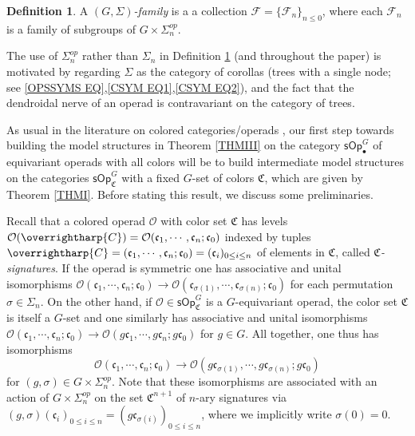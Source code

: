 \documentclass[a4paper,10pt
,draft
]{article}%
\numberwithin{equation}{section}
\numberwithin{figure}{section}
\theoremstyle{definition} %
\newtheorem{definition}[equation]{Definition}%
\newcommand{\vect}[1]{\text{\overrightharp{\ensuremath{#1}}}}
\renewcommand{\O}{\ensuremath{\mathcal O}}
\newcommand{\1}{\ensuremath{\mathbbm 1}}%
\begin{document}
\begin{definition}\label{FAM1ST DEF}
	A \emph{$(G,\Sigma)$-family} is a
	a collection
	$\mathcal{F} = \{\mathcal{F}_n\}_{n \leq 0}$,
	where each $\mathcal{F}_n$
	is a family of subgroups of $G \times \Sigma_n^{op}$.
\end{definition}

The use of $\Sigma_n^{op}$ rather than $\Sigma_n$
in Definition \ref{FAM1ST DEF} 
(and throughout the paper) 
is motivated by regarding $\Sigma$
as the category of corollas (trees with a single node; 
see \eqref{OPSSYMS EQ},\eqref{CSYM EQ1},\eqref{CSYM EQ2}),
and the fact that the dendroidal nerve \cite[\S 1]{MW07} of an operad is contravariant on the category of trees.


As usual in the literature on colored categories/operads
\cite{BM07,Rob11,CM13b,Cav},
our first step towards building the model structures 
in Theorem \ref{THMIII}
on the category
$\mathsf{sOp}^G_{\bullet}$
of equivariant operads with all colors 
will be to build intermediate model structures on the categories
$\mathsf{sOp}^G_{\mathfrak{C}}$
with a fixed $G$-set of colors $\mathfrak{C}$,
which are given by Theorem \ref{THMI}.
Before stating this result, we discuss some preliminaries.



Recall that a colored operad $\O$
with color set $\mathfrak{C}$ has levels 
$
\O(\vect{C})=
\O(\mathfrak{c}_1,\cdots,\mathfrak{c}_n;\mathfrak{c}_0)$
indexed by tuples
$\vect{C} = (\mathfrak{c}_1,\cdots,\mathfrak{c}_n;\mathfrak{c}_0) = (\mathfrak c_i)_{0 \leq i \leq n}$
of elements in $\mathfrak{C}$, called \emph{$\mathfrak{C}$-signatures}.
If the operad is symmetric one has associative and unital isomorphisms
$
\O(\mathfrak{c}_1,\cdots,\mathfrak{c}_n;\mathfrak{c}_0) \to 
\O(\mathfrak{c}_{\sigma(1)},\cdots,\mathfrak{c}_{\sigma(n)};\mathfrak{c}_0)
$
for each permutation $\sigma \in \Sigma_n$.
On the other hand, if 
$\O \in \mathsf{sOp}^G_{\mathfrak{C}}$
is a $G$-equivariant operad, 
the color set $\mathfrak{C}$ is itself a $G$-set
and one similarly has associative and unital isomorphisms
$
\O(\mathfrak{c}_1,\cdots,\mathfrak{c}_n;\mathfrak{c}_0) \to 
\O(g\mathfrak{c}_{1},\cdots,g\mathfrak{c}_{n};g\mathfrak{c}_0)
$ for $g \in G$.
All together, one thus has isomorphisms
\begin{equation}\label{OPSSYMS EQ}
\O(\mathfrak{c}_1,\cdots,\mathfrak{c}_n;\mathfrak{c}_0)
\to 
\O(g \mathfrak{c}_{\sigma(1)},\cdots,g \mathfrak{c}_{\sigma(n)};g\mathfrak{c}_0)
\end{equation}
for $(g,\sigma) \in G \times \Sigma_n^{op}$.
Note that these isomorphisms 
are associated with an action of 
$G \times \Sigma_n^{op}$
on the set $\mathfrak{C}^{n+1}$ of $n$-ary signatures via
$(g,\sigma) (\mathfrak{c}_i)_{0\leq i \leq n}
= (g \mathfrak{c}_{\sigma(i)})_{0\leq i \leq n}$,
where we implicitly write $\sigma(0)=0$.
\end{document}
